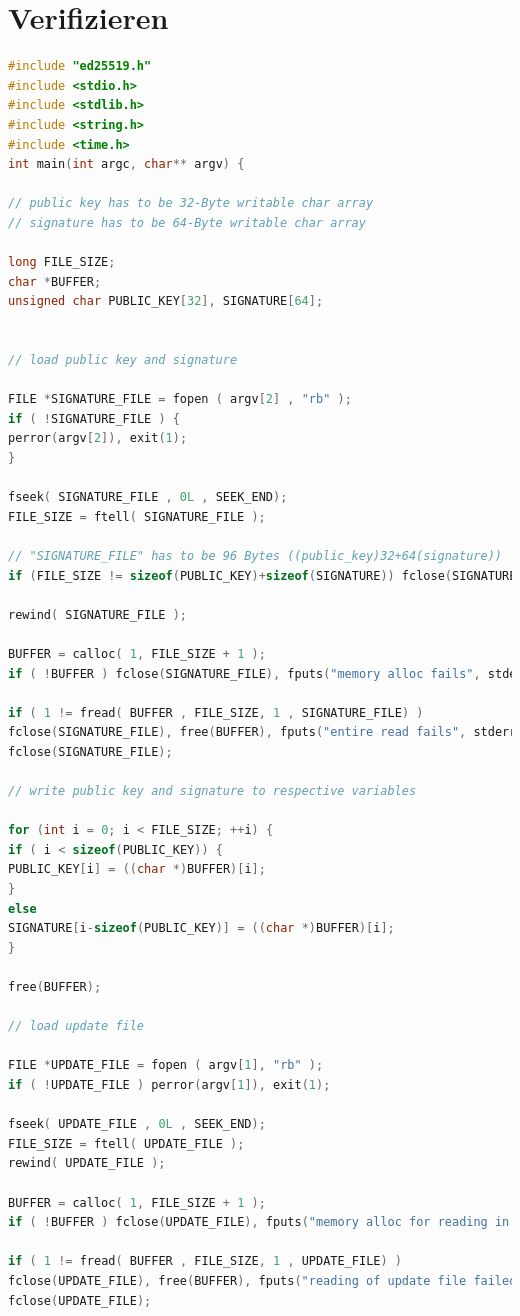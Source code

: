 \documentclass[thesis=bachelor,faculty=cb]{hsmw-thesis}
\begin{document}
{\section{Verifizieren}
\begin{lstlisting}[language=C]
#include "ed25519.h"
#include <stdio.h>
#include <stdlib.h>
#include <string.h>
#include <time.h>
int main(int argc, char** argv) {

// public key has to be 32-Byte writable char array
// signature has to be 64-Byte writable char array

long FILE_SIZE;
char *BUFFER;
unsigned char PUBLIC_KEY[32], SIGNATURE[64];


// load public key and signature

FILE *SIGNATURE_FILE = fopen ( argv[2] , "rb" );
if ( !SIGNATURE_FILE ) {
perror(argv[2]), exit(1);
}

fseek( SIGNATURE_FILE , 0L , SEEK_END);
FILE_SIZE = ftell( SIGNATURE_FILE );

// "SIGNATURE_FILE" has to be 96 Bytes ((public_key)32+64(signature))
if (FILE_SIZE != sizeof(PUBLIC_KEY)+sizeof(SIGNATURE)) fclose(SIGNATURE_FILE), fputs("incompatible signature type\n", stderr), exit(1); 

rewind( SIGNATURE_FILE );

BUFFER = calloc( 1, FILE_SIZE + 1 );
if ( !BUFFER ) fclose(SIGNATURE_FILE), fputs("memory alloc fails", stderr), exit(1);

if ( 1 != fread( BUFFER , FILE_SIZE, 1 , SIGNATURE_FILE) )
fclose(SIGNATURE_FILE), free(BUFFER), fputs("entire read fails", stderr), exit(1);
fclose(SIGNATURE_FILE);

// write public key and signature to respective variables

for (int i = 0; i < FILE_SIZE; ++i) {
if ( i < sizeof(PUBLIC_KEY)) {
PUBLIC_KEY[i] = ((char *)BUFFER)[i];
}
else 
SIGNATURE[i-sizeof(PUBLIC_KEY)] = ((char *)BUFFER)[i];
}

free(BUFFER);

// load update file

FILE *UPDATE_FILE = fopen ( argv[1], "rb" );
if ( !UPDATE_FILE ) perror(argv[1]), exit(1);

fseek( UPDATE_FILE , 0L , SEEK_END);
FILE_SIZE = ftell( UPDATE_FILE );
rewind( UPDATE_FILE );

BUFFER = calloc( 1, FILE_SIZE + 1 );
if ( !BUFFER ) fclose(UPDATE_FILE), fputs("memory alloc for reading in the update file failed", stderr), exit(1);

if ( 1 != fread( BUFFER , FILE_SIZE, 1 , UPDATE_FILE) )
fclose(UPDATE_FILE), free(BUFFER), fputs("reading of update file failed", stderr), exit(1);
fclose(UPDATE_FILE);


\end{lstlisting}}
\end{document}
